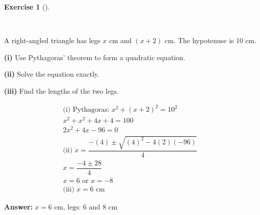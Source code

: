 \documentclass[
  letterpaper,
  DIV=11,
  numbers=noendperiod]{scrreprt}
\theoremstyle{definition}
\newtheorem{exercise}{Exercise}[chapter]
\theoremstyle{remark}
\begin{document}
\begin{exercise}[]\protect\hypertarget{exr-u6-22-1}{}\label{exr-u6-22-1}

~

A right-angled triangle has legs \(x\) cm and \((x + 2)\) cm. The
hypotenuse is 10 cm.

\textbf{(i)} Use Pythagoras' theorem to form a quadratic equation.

\textbf{(ii)} Solve the equation exactly.

\textbf{(iii)} Find the lengths of the two legs.

\begin{tcolorbox}[enhanced jigsaw, opacitybacktitle=0.6, coltitle=black, arc=.35mm, colframe=quarto-callout-tip-color-frame, colback=white, bottomrule=.15mm, left=2mm, colbacktitle=quarto-callout-tip-color!10!white, titlerule=0mm, opacityback=0, title=\textcolor{quarto-callout-tip-color}{\faLightbulb}\hspace{0.5em}{🔍 View Solution}, leftrule=.75mm, breakable, rightrule=.15mm, bottomtitle=1mm, toptitle=1mm, toprule=.15mm]

\begin{align*}
\text{(i) Pythagoras: } x^2 + (x+2)^2 = 10^2 \\ x^2 + x^2 + 4x + 4 = 100 \\ 2x^2 + 4x - 96 = 0 \\ \text{(ii) } x = \dfrac{-(4) \pm \sqrt{(4)^2 - 4(2)(-96)}}{4} \\ x = \dfrac{-4 \pm 28}{4} \\ x = 6 \text{ or } x = -8 \\ \text{(iii) } x = 6 \text{ cm}
\end{align*}

\textbf{Answer:}
\(x = 6 \text{ cm, legs: } 6 \text{ and } 8 \text{ cm}\)

\end{tcolorbox}

\end{exercise}
\end{document}
